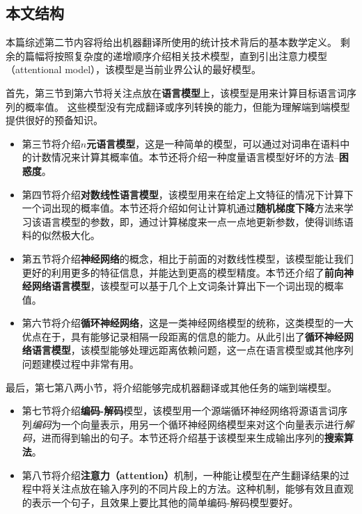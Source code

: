 \documentclass[10pt,a4paper]{ctexart}
\begin{document}
\subsection{本文结构}
本篇综述第二节内容将给出机器翻译所使用的统计技术背后的基本数学定义。
剩余的篇幅将按照复杂度的递增顺序介绍相关技术模型，直到引出注意力模型（attentional model），该模型是当前业界公认的最好模型。

首先，第三节到第六节将关注点放在\textbf{语言模型}上，该模型是用来计算目标语言词序列的概率值。
这些模型没有完成翻译或序列转换的能力，但能为理解端到端模型提供很好的预备知识。

\begin{itemize}
\item 第三节将介绍$n$\textbf{元语言模型}，这是一种简单的模型，可以通过对词串在语料中的计数情况来计算其概率值。本节还将介绍一种度量语言模型好坏的方法--\textbf{困惑度}。
\item 第四节将介绍\textbf{对数线性语言模型}，该模型用来在给定上文特征的情况下计算下一个词出现的概率值。本节还将介绍如何让计算机通过\textbf{随机梯度下降}方法来学习该语言模型的参数，即，通过计算梯度来一点一点地更新参数，使得训练语料的似然极大化。
\item 第五节将介绍\textbf{神经网络}的概念，相比于前面的对数线性模型，该模型能让我们更好的利用更多的特征信息，并能达到更高的模型精度。本节还介绍了\textbf{前向神经网络语言模型}，该模型可以基于几个上文词条计算出下一个词出现的概率值。
\item 第六节将介绍\textbf{循环神经网络}，这是一类神经网络模型的统称，这类模型的一大优点在于，具有能够记录相隔一段距离的信息的能力。从此引出了\textbf{循环神经网络语言模型}，该模型能够处理远距离依赖问题，这一点在语言模型或其他序列问题建模过程中非常有用。
\end{itemize}

最后，第七第八两小节，将介绍能够完成机器翻译或其他任务的端到端模型。

\begin{itemize}
\item 第七节将介绍\textbf{编码-解码}模型，该模型用一个源端循环神经网络将源语言词序列\textit{编码}为一个向量表示，用另一个循环神经网络模型来对这个向量表示进行\textit{解码}，进而得到输出的句子。本节还将介绍基于该模型来生成输出序列的\textbf{搜索算法}。
\item 第八节将介绍\textbf{注意力（attention）}机制，一种能让模型在产生翻译结果的过程中将关注点放在输入序列的不同片段上的方法。这种机制，能够有效且直观的表示一个句子，且效果上要比其他的简单编码-解码模型要好。
\end{itemize}
\end{document}
